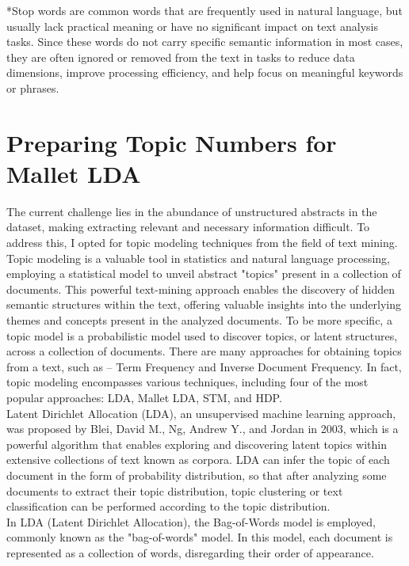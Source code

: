 \documentclass[12pt,twoside]{report}
\begin{document}
*Stop words are common words that are frequently used in natural language, but usually lack practical meaning or have no significant impact on text analysis tasks. Since these words do not carry specific semantic information in most cases, they are often ignored or removed from the text in tasks to reduce data dimensions, improve processing efficiency, and help focus on meaningful keywords or phrases.\cite{rajaraman2011mining}

\section*{Preparing Topic Numbers for Mallet LDA}

The current challenge lies in the abundance of unstructured abstracts  in the dataset, making extracting relevant and necessary information difficult. To address this, I opted for topic modeling techniques from the field of text mining. \\

Topic modeling is a valuable tool in statistics and natural language processing, employing a statistical model to unveil abstract "topics" present in a collection of documents. This powerful text-mining approach enables the discovery of hidden semantic structures within the text, offering valuable insights into the underlying themes and concepts present in the analyzed documents.\cite{arun2010finding} To be more specific, a topic model is a probabilistic model used to discover topics, or latent structures, across a collection of documents.\cite{saxton2018gentle} There are many approaches for obtaining topics from a text, such as – Term Frequency and Inverse Document Frequency. In fact, topic modeling encompasses various techniques, including four of the most popular approaches: LDA, Mallet LDA, STM, and HDP. \cite{egger2022topic}\\

Latent Dirichlet Allocation (LDA), an unsupervised machine learning approach, was proposed by Blei, David M., Ng, Andrew Y., and Jordan in 2003, which is a powerful algorithm that enables exploring and discovering latent topics within extensive collections of text known as corpora.\cite{chipidza2022topic} LDA can infer the topic of each document in the form of probability distribution, so that after analyzing some documents to extract their topic distribution, topic clustering or text classification can be performed according to the topic distribution. \cite{blei2012probabilistic}\\ In LDA (Latent Dirichlet Allocation), the Bag-of-Words model is employed, commonly known as the "bag-of-words" model. In this model, each document is represented as a collection of words, disregarding their order of appearance. \\
\end{document}
